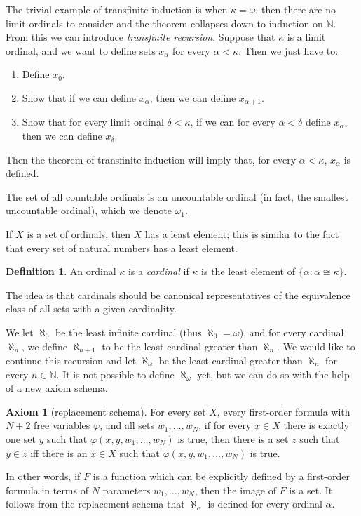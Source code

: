 \documentclass[12pt]{book}
\newcommand{\NN}{\mathbb{N}}
\newcommand{\dfn}[1]{\emph{#1}\index{#1}}
\theoremstyle{definition}
\newtheorem{axiom}[theorem]{Axiom}
\newtheorem{definition}[theorem]{Definition}
\begin{document}
The trivial example of transfinite induction is when $\kappa = \omega$; then there are no limit ordinals to consider and the theorem collapses down to induction on $\NN$.
From this we can introduce \dfn{transfinite recursion}.
Suppose that $\kappa$ is a limit ordinal, and we want to define sets $x_\alpha$ for every $\alpha < \kappa$. Then we just have to:
\begin{enumerate}
\item Define $x_0$.
\item Show that if we can define $x_\alpha$, then we can define $x_{\alpha + 1}$.
\item Show that for every limit ordinal $\delta < \kappa$, if we can for every $\alpha < \delta$ define $x_\alpha$, then we can define $x_\delta$.
\end{enumerate}
Then the theorem of transfinite induction will imply that, for every $\alpha < \kappa$, $x_\alpha$ is defined.

The set of all countable ordinals is an uncountable ordinal (in fact, the smallest uncountable ordinal), which we denote $\omega_1$.

If $X$ is a set of ordinals, then $X$ has a least element; this is similar to the fact that every set of natural numbers has a least element.
\begin{definition}
An ordinal $\kappa$ is a \dfn{cardinal} if $\kappa$ is the least element of $\{\alpha: \alpha \cong \kappa\}$.
\end{definition}
The idea is that cardinals should be canonical representatives of the equivalence class of all sets with a given cardinality.

We let $\aleph_0$ be the least infinite cardinal (thus $\aleph_0 = \omega$), and for every cardinal $\aleph_n$, we define $\aleph_{n+1}$ to be the least cardinal greater than $\aleph_n$.
We would like to continue this recursion and let $\aleph_\omega$ be the least cardinal greater than $\aleph_n$ for every $n \in \NN$.
It is not possible to define $\aleph_\omega$ yet, but we can do so with the help of a new axiom schema.

\begin{axiom}[replacement schema]
For every set $X$, every first-order formula with $N+2$ free variables $\varphi$, and all sets $w_1, \dots, w_N$, if for every $x \in X$ there is exactly one set $y$ such that $\varphi(x, y, w_1, \dots, w_N)$ is true, then there is a set $z$ such that $y \in z$ iff there is an $x \in X$ such that $\varphi(x, y, w_1, \dots, w_N)$ is true.
\end{axiom}
In other words, if $F$ is a function which can be explicitly defined by a first-order formula in terms of $N$ parameters $w_1, \dots, w_N$, then the image of $F$ is a set.
It follows from the replacement schema that $\aleph_\alpha$ is defined for every ordinal $\alpha$.
\end{document}
